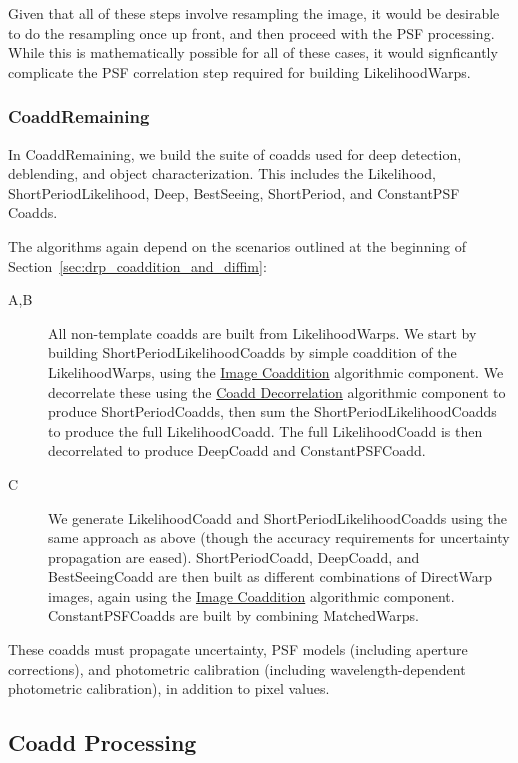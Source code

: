 Given that all of these steps involve resampling the image, it would be desirable to do the resampling once up front, and then proceed with the PSF processing.  While this is mathematically possible for all of these cases, it would signficantly complicate the PSF correlation step required for building LikelihoodWarps.

\subsubsection{CoaddRemaining}
\label{sec:drpCoaddRemaining}

In CoaddRemaining, we build the suite of coadds used for deep detection, deblending, and object characterization.  This includes the Likelihood, ShortPeriodLikelihood, Deep, BestSeeing, ShortPeriod, and ConstantPSF Coadds.

The algorithms again depend on the scenarios outlined at the beginning of Section~\ref{sec:drp_coaddition_and_diffim}:
\begin{description}
\item[A,B] All non-template coadds are built from LikelihoodWarps.  We start by building ShortPeriodLikelihoodCoadds by simple coaddition of the LikelihoodWarps, using the \hyperref[sec:acCoaddition]{Image Coaddition} algorithmic component.  We decorrelate these using the \hyperref[sec:acCoaddDecorrelation]{Coadd Decorrelation} algorithmic component to produce ShortPeriodCoadds, then sum the ShortPeriodLikelihoodCoadds to produce the full LikelihoodCoadd.  The full LikelihoodCoadd is then decorrelated to produce DeepCoadd and ConstantPSFCoadd.
\item[C] We generate LikelihoodCoadd and ShortPeriodLikelihoodCoadds using the same approach as above (though the accuracy requirements for uncertainty propagation are eased). ShortPeriodCoadd, DeepCoadd, and BestSeeingCoadd are then built as different combinations of DirectWarp images, again using the \hyperref[sec:acCoaddition]{Image Coaddition} algorithmic component.  ConstantPSFCoadds are built by combining MatchedWarps.
\end{description}

These coadds must propagate uncertainty, PSF models (including aperture corrections), and photometric calibration (including wavelength-dependent photometric calibration), in addition to pixel values.

\subsection{Coadd Processing}
\label{sec:drp_coadd_processing}


